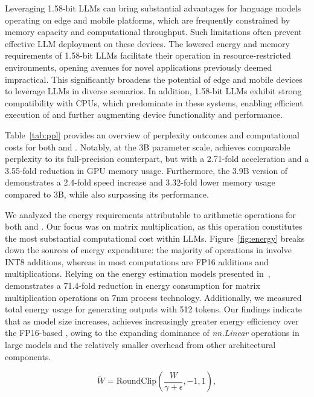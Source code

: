 Leveraging 1.58-bit LLMs can bring substantial advantages for language models operating on edge and mobile platforms, which are frequently constrained by memory capacity and computational throughput. Such limitations often prevent effective LLM deployment on these devices. The lowered energy and memory requirements of 1.58-bit LLMs facilitate their operation in resource-restricted environments, opening avenues for novel applications previously deemed impractical. This significantly broadens the potential of edge and mobile devices to leverage LLMs in diverse scenarios. In addition, 1.58-bit LLMs exhibit strong compatibility with CPUs, which predominate in these systems, enabling efficient execution of  and further augmenting device functionality and performance.

Table~\ref{tab:ppl} provides an overview of perplexity outcomes and computational costs for both  and . Notably, at the 3B parameter scale,  achieves comparable perplexity to its full-precision  counterpart, but with a 2.71-fold acceleration and a 3.55-fold reduction in GPU memory usage. Furthermore, the 3.9B version of  demonstrates a 2.4-fold speed increase and 3.32-fold lower memory usage compared to  3B, while also surpassing its performance.

We analyzed the energy requirements attributable to arithmetic operations for both  and . Our focus was on matrix multiplication, as this operation constitutes the most substantial computational cost within LLMs. Figure~\ref{fig:energy} breaks down the sources of energy expenditure: the majority of operations in  involve INT8 additions, whereas in  most computations are FP16 additions and multiplications. Relying on the energy estimation models presented in~\cite{energycost, pokebnn},  demonstrates a 71.4-fold reduction in energy consumption for matrix multiplication operations on 7nm process technology. Additionally, we measured total energy usage for generating outputs with 512 tokens. Our findings indicate that as model size increases,  achieves increasingly greater energy efficiency over the FP16-based , owing to the expanding dominance of \emph{nn.Linear} operations in large models and the relatively smaller overhead from other architectural components.

\begin{equation}
    \widetilde{W} = \mathrm{RoundClip}(\frac{W}{\gamma + \epsilon}, -1, 1),
\end{equation}

